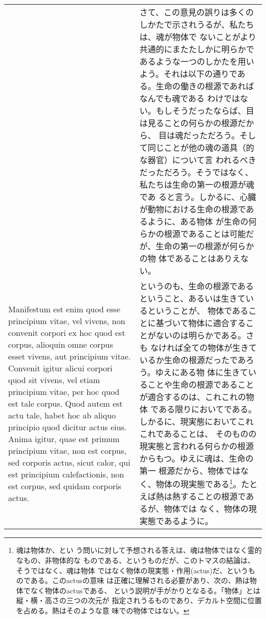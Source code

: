 \documentclass[paper=a4paper,fontsize=10pt,jafontsize=9pt,titlepage]{jlreq}
\begin{document}
\begin{longtable}{p{21em}p{21em}}
&

さて、この意見の誤りは多くのしかたで示されうるが、私たちは、魂が物体で
ないことがより共通的にまたたしかに明らかであるような一つのしかたを用い
よう。それは以下の通りである。生命の働きの根源であればなんでも魂である
わけではない。もしそうだったならば、目は見ることの何らかの根源だから、
目は魂だっただろう。そして同じことが他の魂の道具（的な器官）について言
われるべきだっただろう。そうではなく、私たちは生命の第一の根源が魂であ
ると言う。しかるに、心臓が動物における生命の根源であるように、ある物体
が生命の何らかの根源であることは可能だが、生命の第一の根源が何らかの物
体であることはありえない。



\\



Manifestum est enim quod esse
principium vitae, vel vivens, non convenit corpori ex hoc quod est
corpus, alioquin omne corpus esset vivens, aut principium
vitae. Convenit igitur alicui corpori quod sit vivens, vel etiam
principium vitae, per hoc quod est tale corpus. Quod autem est actu
tale, habet hoc ab aliquo principio quod dicitur actus eius. Anima
igitur, quae est primum principium vitae, non est corpus, sed corporis
actus, sicut calor, qui est principium calefactionis, non est corpus,
sed quidam corporis actus.


&

というのも、生命の根源であるということ、あるいは生きているということが、
物体であることに基づいて物体に適合することがないのは明らかである。さも
なければ全ての物体が生きているか生命の根源だったであろう。ゆえにある物
体に生きていることや生命の根源であることが適合するのは、これこれの物体
である限りにおいてである。しかるに、現実態においてこれこれであることは、
そのものの現実態と言われる何らかの根源からもつ。ゆえに魂は、生命の第一
根源だから、物体ではなく、物体の現実態である\footnote{魂は物体か、とい
う問いに対して予想される答えは、魂は物体ではなく霊的なもの、非物体的な
ものである、というものだが、このトマスの結論は、そうではなく、魂は物体
ではなく物体の現実態・作用(actus)だ、というものである。このactusの意味
 は正確に理解される必要があり、次の、熱は物体でなく物体のactusである、
 という説明が手がかりとなるる。「物体」とは縦・横・高さの三つの次元が
 指定されうるものであり、デカルト空間に位置を占める。熱はそのような意
 味での物体ではない。}。たとえば熱は熱することの根源であるが、物体では
なく、物体の現実態であるように。



\\




\end{longtable}
\end{document}
